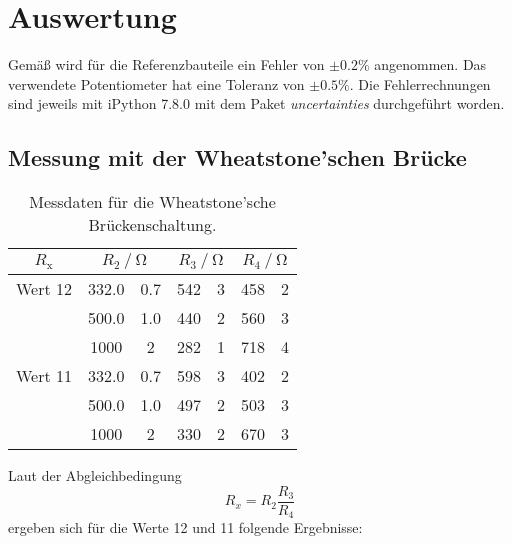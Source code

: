 \section{Auswertung}
\label{sec:Auswertung}
Gemäß \cite{Versuchsanleitung} wird für die Referenzbauteile ein Fehler von $\pm{0.2\%}$ angenommen. 
Das verwendete Potentiometer hat eine Toleranz von $\pm{0.5\%}$.
Die Fehlerrechnungen sind jeweils mit iPython 7.8.0 mit dem Paket \textit{uncertainties} durchgeführt worden.
\subsection{Messung mit der Wheatstone'schen Brücke}
    \begin{table}
        \centering
        \caption{Messdaten für die Wheatstone'sche Brückenschaltung.}
        \label{tab:wheat}
        \begin{tabular}{c S[table-format=4.1] @{${}\pm{}$} S[table-format=1.1] S[table-format=3.0] @{${}\pm{}$} S[table-format=1.0] S[table-format=3.0] @{${}\pm{}$} S[table-format=1.0]}
            \toprule
            {$R_\text{x}$} &  &  &  \\
            \midrule
            Wert 12 & 332.0 & 0.7   & 542 & 3 & 458 & 2 \\
                    & 500.0 & 1.0   & 440 & 2 & 560 & 3 \\
                    & 1000  & 2     & 282 & 1 & 718 & 4 \\
            Wert 11 & 332.0 & 0.7   & 598 & 3 & 402 & 2 \\
                    & 500.0 & 1.0   & 497 & 2 & 503 & 3 \\
                    & 1000  & 2     & 330 & 2 & 670 & 3 \\
            \bottomrule
        \end{tabular}
    \end{table}
    Laut der Abgleichbedingung
    \begin{equation}
        R_x = R_2 \frac{R_3}{R_4}
    \end{equation}
    ergeben sich für die Werte 12 und 11 folgende Ergebnisse:
